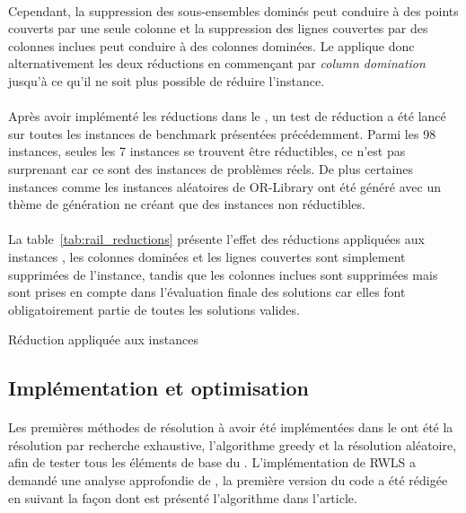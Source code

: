 \documentclass[a4paper,11pt,twoside,french,report]{../common/simplem}
\begin{document}
				\paragraph*{}
					Cependant, la suppression des sous-ensembles dominés peut conduire à des points couverts par une seule colonne et la suppression des lignes couvertes par des colonnes inclues peut conduire à des colonnes dominées. Le \solver{} applique donc alternativement les deux réductions en commençant par \textit{column domination} jusqu'à ce qu'il ne soit plus possible de réduire l'instance.
				\paragraph*{}
					Après avoir implémenté les réductions dans le \solver{}, un test de réduction a été lancé sur toutes les instances de benchmark présentées précédemment. Parmi les 98 instances, seules les 7 instances  se trouvent être réductibles, ce n'est pas surprenant car ce sont des instances de problèmes réels. De plus certaines instances comme les instances aléatoires de OR-Library ont été généré avec un thème de génération ne créant que des instances non réductibles.
				\paragraph*{}
					La table~\ref{tab:rail_reductions} présente l'effet des réductions appliquées aux instances , les colonnes dominées et les lignes couvertes sont simplement supprimées de l'instance, tandis que les colonnes inclues sont supprimées mais sont prises en compte dans l'évaluation finale des solutions car elles font obligatoirement partie de toutes les solutions valides.
				\begin{table}[H]
					\centering
					\caption{Réduction appliquée aux instances }
					\label{tab:rail_reductions}
					
				\end{table}
			\subsection{Implémentation et optimisation}
				\paragraph*{}
					Les premières méthodes de résolution à avoir été implémentées dans le \solver{} ont été la résolution par recherche exhaustive, l'algorithme greedy et la résolution aléatoire, afin de tester tous les éléments de base du \solver{}. L'implémentation de \gls{RWLS} a demandé une analyse approfondie de \cite{Gao2015}, la première version du code a été rédigée en suivant la façon dont est présenté l'algorithme dans l'article.
\end{document}
